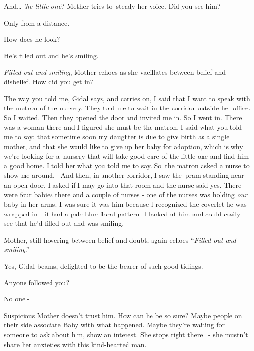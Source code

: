 \documentclass[letterpaper]{article}
\begin{document}
{\textquotedbl}And{\dots} \textit{the little one}?{\textquotedbl} Mother tries to~steady her voice.{\textquotedbl} Did
you see him?{\textquotedbl} 

{\textquotedbl}Only from a distance.{\textquotedbl} 

{\textquotedbl}How does he look?{\textquotedbl} 

{\textquotedbl}He's filled out and he's smiling.{\textquotedbl} 

{\textquotedbl}\textit{Filled out and smiling},{\textquotedbl} Mother echoes as she vacillates between belief and
disbelief. {\textquotedbl}How did you get in?{\textquotedbl} 

{\textquotedbl}The way you told me,{\textquotedbl} Gidal says, and carries on, {\textquotedbl}I said that I want to
speak with the matron of the nursery. They told me to wait in the corridor outside her office. So I waited. Then they
opened the door and invited me in. So I went in. There was a woman there and I figured she must be the matron. I said
what you told me to say: that sometime soon my daughter is due to give birth as a single mother, and that she would
like to give up her baby for adoption, which is why we're looking for a~nursery that will take good care of the little
one and find him a good home. I told her what you told me to say. So~the matron asked a nurse to show me around.~ And
then, in another corridor, I saw the~pram standing near an open door. I asked if I may go into that room and the nurse
said yes. There were four babies there and a couple of nurses - one of the nurses was holding\textit{ our }baby in her
arms. I was sure it was him because I recognized the coverlet he was wrapped in - it had a pale blue floral pattern. I
looked at him and could easily see that he'd filled out and was smiling. {\textquotedbl} 

Mother, still hovering between belief and doubt, again\textcolor[rgb]{0.0,0.4392157,0.7529412}{ }echoes ``\textit{Filled
out and smiling}.'' 

{\textquotedbl}Yes,{\textquotedbl} Gidal beams, delighted to be the bearer of such good tidings. 

{\textquotedbl}Anyone followed you?{\textquotedbl} 

{\textquotedbl}No one -{\textquotedbl} 

Suspicious\textcolor[rgb]{0.0,0.4392157,0.7529412}{ }Mother doesn't trust him. How can he be so sure? Maybe people on
their side associate Baby with what happened. Maybe they're waiting for someone to ask about him, show an interest. She
stops right there \ {}- she mustn't share her anxieties with this kind-hearted man. 
\end{document}
